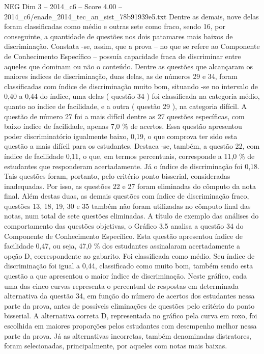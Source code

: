 \begin{textsample}{NEG Dim 3 – 2014\_c6 – Score 4.00 – 2014\_c6/enade\_2014\_tec\_an\_sist\_78b91939e5.txt}
Dentre as demais, nove delas foram classificadas como médio e outras sete como fraco, sendo 16, por conseguinte, a quantidade de questões nos dois patamares mais baixos de discriminação.
Constata -se, assim, que a prova – no que se refere ao Componente de Conhecimento Específico – possuía capacidade fraca de discriminar entre aqueles que dominam ou não o conteúdo.
Dentre as questões que alcançaram os maiores índices de discriminação, duas delas, as de números 29 e 34, foram classificadas com índice de discriminação muito bom, situando -se no intervalo de 0,40 a 0,44 do índice, uma delas ( questão 34 ) foi classificada na categoria médio, quanto ao índice de facilidade, e a outra ( questão 29 ), na categoria difícil.
A questão de número 27 foi a mais difícil dentre as 27 questões específicas, com baixo índice de facilidade, apenas 7,0 \% de acertos.
Essa questão apresentou poder discriminatório igualmente baixo, 0,19, o que comprova ter sido esta questão a mais difícil para os estudantes.
Destaca -se, também, a questão 22, com índice de facilidade 0,11, o que, em termos percentuais, corresponde a 11,0 \% de estudantes que responderam acertadamente.
Já o índice de discriminação foi 0,18.
Tais questões foram, portanto, pelo critério ponto bisserial, consideradas inadequadas.
Por isso, as questões 22 e 27 foram eliminadas do cômputo da nota final.
Além destas duas, as demais questões com índice de discriminação fraco, questões 13, 18, 19, 30 e 35 também não foram utilizadas no cômputo final das notas, num total de sete questões eliminadas.
A título de exemplo das análises do comportamento das questões objetivas, o Gráfico 3.5 analisa a questão 34 do Componente de Conhecimento Específico.
Esta questão apresentou índice de facilidade 0,47, ou seja, 47,0 \% dos estudantes assinalaram acertadamente a opção D, correspondente ao gabarito.
Foi classificada como médio.
Seu índice de discriminação foi igual a 0,44, classificado como muito bom, também sendo esta questão a que apresentou o maior índice de discriminação.
Neste gráfico, cada uma das cinco curvas representa o percentual de respostas em determinada alternativa da questão 34, em função do número de acertos dos estudantes nessa parte da prova, antes de possíveis eliminações de questões pelo critério do ponto bisserial.
A alternativa correta D, representada no gráfico pela curva em roxo, foi escolhida em maiores proporções pelos estudantes com desempenho melhor nessa parte da prova.
Já as alternativas incorretas, também denominadas distratores, foram selecionadas, principalmente, por aqueles com notas mais baixas.

\end{textsample}
